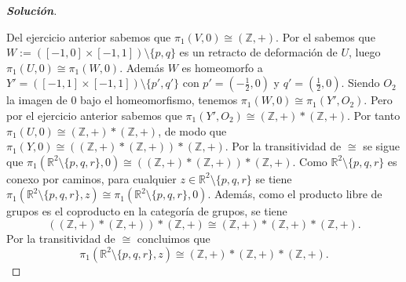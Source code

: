 \begin{proof}[\textbf{Solución}]
\begin{center}
\end{center}
Del ejercicio anterior sabemos que $\pi_1(V,0)\cong(\mathbb{Z},+)$. Por el  sabemos que $W:=([-1,0]\times[-1,1])\setminus\{p,q\}$ es un retracto de deformación de $U$, luego $\pi_1(U,0)\cong\pi_1(W,0)$. Además $W$ es homeomorfo a $Y'=([-1,1]\times[-1,1])\setminus\{p',q'\}$ con $p'=(-\tfrac12,0)$ y $q'=(\tfrac12,0)$. Siendo $O_2$ la imagen de $0$ bajo el homeomorfismo, tenemos $\pi_1(W,0)\cong\pi_1(Y',O_2)$. Pero por el ejercicio anterior sabemos que $\pi_1(Y',O_2)\cong(\mathbb{Z},+)*(\mathbb{Z},+)$. Por tanto $\pi_1(U,0)\cong(\mathbb{Z},+)*(\mathbb{Z},+)$, de modo que $\pi_1(Y,0)\cong((\mathbb{Z},+)*(\mathbb{Z},+))*(\mathbb{Z},+)$. Por la transitividad de $\cong$ se sigue que $\pi_1(\mathbb{R}^2\setminus\{p,q,r\},0)\cong((\mathbb{Z},+)*(\mathbb{Z},+))*(\mathbb{Z},+)$. Como $\mathbb{R}^2\setminus\{p,q,r\}$ es conexo por caminos, para cualquier $z\in\mathbb{R}^2\setminus\{p,q,r\}$ se tiene $\pi_1(\mathbb{R}^2\setminus\{p,q,r\},z)\cong\pi_1(\mathbb{R}^2\setminus\{p,q,r\},0)$. Además, como el producto libre de grupos es el coproducto en la categoría de grupos, se tiene
\[
((\mathbb{Z},+)*(\mathbb{Z},+))*(\mathbb{Z},+)\cong(\mathbb{Z},+)*(\mathbb{Z},+)*(\mathbb{Z},+).
\]
Por la transitividad de $\cong$ concluimos que
\[
\pi_1(\mathbb{R}^2\setminus\{p,q,r\},z)\cong(\mathbb{Z},+)*(\mathbb{Z},+)*(\mathbb{Z},+).
\]
\end{proof}\clearpage
